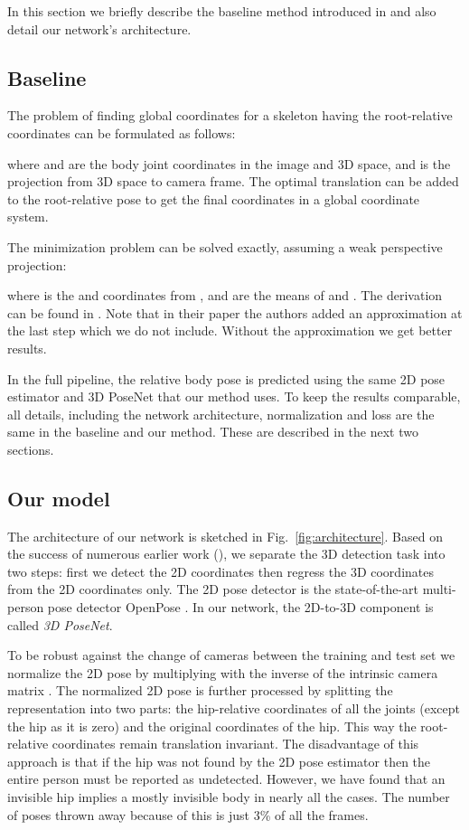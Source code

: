 \documentclass[conference]{IEEEtran}
\begin{document}
In this section we briefly describe the baseline method introduced in \cite{mehta} and also detail our network's architecture.

\subsection{Baseline}
The problem of finding global coordinates for a skeleton having the root-relative coordinates can be formulated as follows:

where  and  are the body joint coordinates in the image and 3D space, and  is the projection from 3D space to camera frame. The optimal translation  can be added to the root-relative pose  to get the final coordinates in a global coordinate system.

The minimization problem can be solved exactly, assuming a weak perspective projection:


where  is the  and  coordinates from ,  and  are the means of   and . The derivation can be found in \cite{mehta}. Note that in their paper  the authors added an approximation at the last step which we do not include. Without the approximation we get better results.

In the full pipeline, the relative body pose is predicted using the same 2D pose estimator and 3D PoseNet that our method uses. To keep the results comparable, all details, including the network architecture, normalization and loss are the same in the baseline and our method. These are described in the next two sections.

\subsection{Our model}
The architecture of our network is sketched in Fig.~\ref{fig:architecture}. Based on the success of numerous earlier work (\cite{3dbaseline,fang2018posegrammar,lee2018pLSTM}),  we separate the 3D detection task into two steps: first we detect the 2D coordinates then regress the 3D coordinates from the 2D coordinates only. The 2D pose detector is the state-of-the-art multi-person pose detector OpenPose \cite{openpose}. In our network, the 2D-to-3D component is called \emph{3D PoseNet}.

To be robust against the change of cameras between the training and test set we normalize the 2D pose by multiplying with the inverse of the intrinsic camera matrix . The normalized 2D pose is further processed by splitting the representation into two parts: the hip-relative coordinates of all the joints (except the hip as it is zero) and the original coordinates of the hip. This way the root-relative coordinates remain translation invariant. The disadvantage of this approach is that if the hip was not found by the 2D pose estimator then the entire person must be reported as undetected. However, we have found that an invisible hip implies a mostly invisible body in nearly all the cases. The number of poses thrown away because of this is just 3\% of all the frames. 
\end{document}
